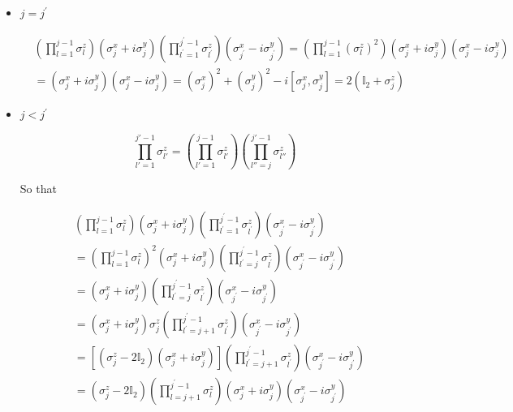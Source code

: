 \documentclass{article}
\begin{document}
\begin{itemize}

\item $j=j^\prime$

\begin{align}
 &\left( \prod_{l=1}^{j-1} \sigma_l^z \right) \left( \sigma_j^x + i \sigma_j^y\right) \left( \prod_{l^\prime=1}^{j^\prime-1} \sigma_{l^\prime}^z \right) \left( \sigma_{j^\prime}^x - i \sigma_{j^\prime}^y\right) =\left( \prod_{l=1}^{j-1} \left(\sigma_l^z\right)^2 \right) \left( \sigma_j^x + i \sigma_j^y\right) \left( \sigma_{j}^x - i \sigma_{j}^y\right) \\
 &= \left( \sigma_j^x + i \sigma_j^y\right) \left( \sigma_{j}^x - i \sigma_{j}^y\right) = \left(\sigma_j^x\right)^2 + \left(\sigma_j^y\right)^2 - i [\sigma_j^x,\sigma_j^y] = 2 \left( \mathbb{I}_2 + \sigma^z_j\right)
\end{align}

\item $j < j^\prime$

\begin{equation}
\prod_{l'=1}^{j'-1} \sigma_{l'}^z = \left( \prod_{l'=1}^{j-1} \sigma_{l'}^z \right) \left( \prod_{l''=j}^{j'-1} \sigma_{l''}^z \right)
\end{equation}

So that

\begin{align}
&\left( \prod_{l=1}^{j-1} \sigma_l^z \right) \left( \sigma_j^x + i \sigma_j^y\right) \left( \prod_{l^\prime=1}^{j^\prime-1} \sigma_{l^\prime}^z \right) \left( \sigma_{j^\prime}^x - i \sigma_{j^\prime}^y\right) \\
&= \left( \prod_{l=1}^{j-1} \sigma_l^z \right)^2 \left( \sigma_j^x + i \sigma_j^y\right) \left( \prod_{l^\prime=j}^{j^\prime-1} \sigma_{l^\prime}^z \right) \left( \sigma_{j^\prime}^x - i \sigma_{j^\prime}^y\right)\\
& = \left( \sigma_j^x + i \sigma_j^y\right) \left( \prod_{l^\prime=j}^{j^\prime-1} \sigma_{l^\prime}^z \right) \left( \sigma_{j^\prime}^x - i \sigma_{j^\prime}^y\right)\\ 
&= \left( \sigma_j^x + i \sigma_j^y\right) \sigma_j^z \left( \prod_{l^\prime=j+1}^{j^\prime-1} \sigma_{l^\prime}^z \right) \left( \sigma_{j^\prime}^x - i \sigma_{j^\prime}^y\right)\\
& = \left[ \left(\sigma_j^z - 2 \mathbb{I}_2\right) \left( \sigma_j^x + i \sigma_j^y\right) \right]  \left( \prod_{l^\prime=j+1}^{j^\prime-1} \sigma_{l^\prime}^z \right) \left( \sigma_{j^\prime}^x - i \sigma_{j^\prime}^y\right)\\
&= \left(\sigma_j^z - 2 \mathbb{I}_2\right) \left( \prod_{l=j+1}^{j^\prime-1} \sigma_{l}^z \right) \left( \sigma_j^x + i \sigma_j^y\right) \left( \sigma_{j^\prime}^x - i \sigma_{j^\prime}^y\right) 
\end{align}


\end{itemize}
\end{document}
